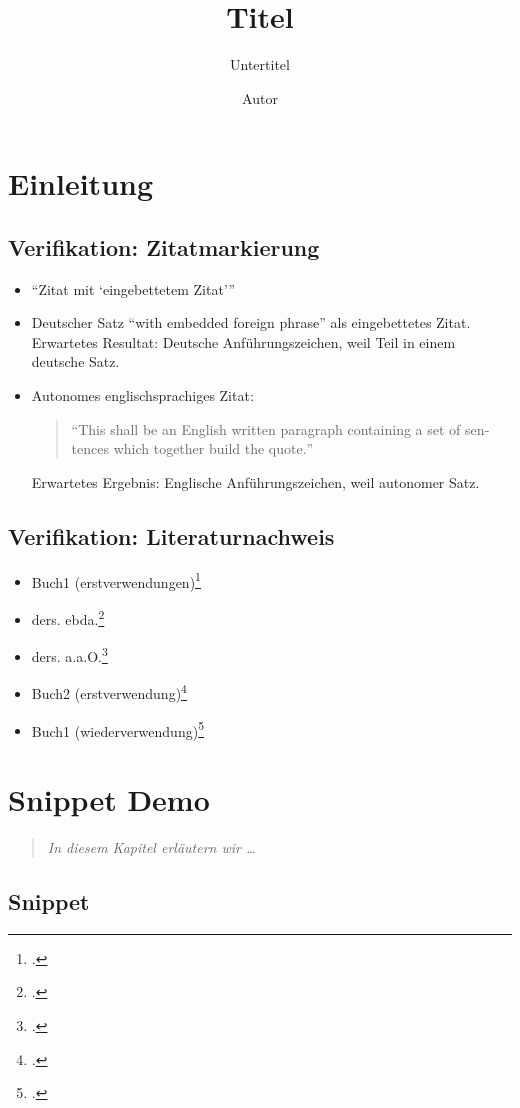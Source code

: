 \documentclass[
  DIV=calc,
  BCOR=5mm,
  11pt,
  headings=small,
  oneside,
  abstract=true,
  toc=bib,
  english,ngerman]{scrbook}
\begin{document}
\nocite{*}

\titlehead{Klassifikation}
\subject{Release }
\title{Titel}
\subtitle{Untertitel}
\author{Autor}

\maketitle

\chapter{Einleitung}

\section{Verifikation: Zitatmarkierung}


\begin{itemize}

  \item \enquote{Zitat mit \enquote{eingebettetem Zitat}}

  \item Deutscher Satz \foreignquote{german}{with embedded foreign phrase}
  als eingebettetes Zitat. Erwartetes Resultat: Deutsche Anführungszeichen,
  weil Teil in einem deutsche Satz.

  \item Autonomes englischsprachiges Zitat:
  \begin{quote}
    \foreignquote{english}{This shall be an English written paragraph containing
    a set of sentences which together build the quote.}
  \end{quote}
  Erwartetes Ergebnis: Englische Anführungszeichen, weil autonomer Satz.
\end{itemize}

\section{Verifikation: Literaturnachweis}
\begin{itemize}
  \item Buch1 (erstverwendungen)\footcite[vgl.][15]{KantKdrV1974}
  \item ders. ebda.\footcite[vgl.][15]{KantKdrV1974}
  \item ders. a.a.O.\footcite[vgl.][23]{KantKdrV1974}
  \item Buch2 (erstverwendung)\footcite[vgl.][15]{KantKdU1974}
  \item Buch1 (wiederverwendung)\footcite[vgl.][15]{KantKdrV1974}
\end{itemize}

\chapter{Snippet Demo}
\begin{quote}\itshape
In diesem Kapitel erläutern wir \ldots
\end{quote}

\section{Snippet}






\printnomenclature
\printbibliography
\end{document}
